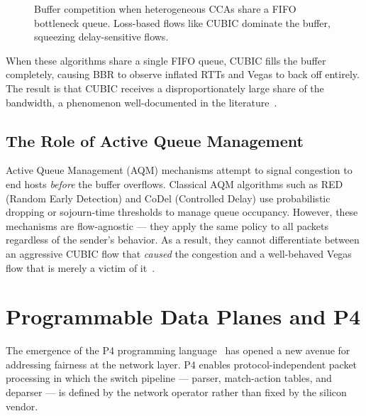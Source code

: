 \documentclass[12pt,a4paper]{report}
\begin{document}
\begin{figure}[H]
{%
}
\caption{Buffer competition when heterogeneous CCAs share a FIFO bottleneck queue. Loss-based flows like CUBIC dominate the buffer, squeezing delay-sensitive flows.}
\label{fig:cca_competition}
\end{figure}

When these algorithms share a single FIFO queue, CUBIC fills the buffer completely, causing BBR to observe inflated RTTs and Vegas to back off entirely. The result is that CUBIC receives a disproportionately large share of the bandwidth, a phenomenon well-documented in the literature~\cite{p4air, ccaaware, buffermgmt}.

\subsection{The Role of Active Queue Management}
Active Queue Management (AQM) mechanisms attempt to signal congestion to end hosts \textit{before} the buffer overflows. Classical AQM algorithms such as RED (Random Early Detection) and CoDel (Controlled Delay) use probabilistic dropping or sojourn-time thresholds to manage queue occupancy. However, these mechanisms are flow-agnostic — they apply the same policy to all packets regardless of the sender's behavior. As a result, they cannot differentiate between an aggressive CUBIC flow that \textit{caused} the congestion and a well-behaved Vegas flow that is merely a victim of it~\cite{ccaaware, pfq}.

\section{Programmable Data Planes and P4}
The emergence of the P4 programming language~\cite{p4lang} has opened a new avenue for addressing fairness at the network layer. P4 enables protocol-independent packet processing in which the switch pipeline — parser, match-action tables, and deparser — is defined by the network operator rather than fixed by the silicon vendor.
\end{document}
